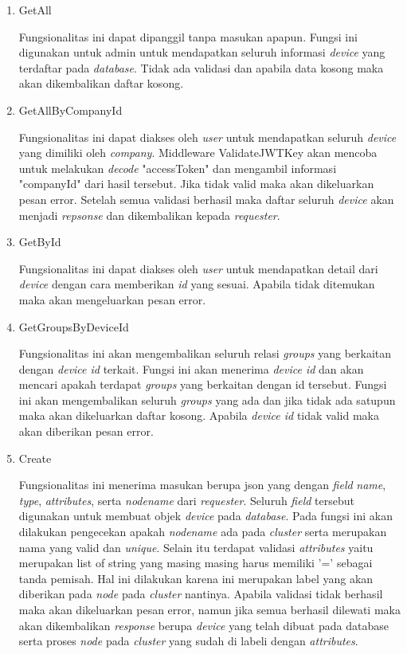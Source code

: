 \begin{enumerate}
  \item GetAll

        Fungsionalitas ini dapat dipanggil tanpa masukan apapun. Fungsi ini digunakan untuk admin untuk mendapatkan seluruh informasi \textit{device} yang terdaftar pada \textit{database}. Tidak ada validasi dan apabila data kosong maka akan dikembalikan daftar kosong.

  \item GetAllByCompanyId

        Fungsionalitas ini dapat diakses oleh \textit{user} untuk mendapatkan seluruh \textit{device} yang dimiliki oleh \textit{company}. Middleware ValidateJWTKey akan mencoba untuk melakukan \textit{decode} "accessToken" dan mengambil informasi "companyId" dari hasil tersebut. Jika tidak valid maka akan dikeluarkan pesan error. Setelah semua validasi berhasil maka daftar seluruh \textit{device} akan menjadi \textit{repsonse} dan dikembalikan kepada \textit{requester}.

  \item GetById

        Fungsionalitas ini dapat diakses oleh \textit{user} untuk mendapatkan detail dari \textit{device} dengan cara memberikan \textit{id} yang sesuai. Apabila tidak ditemukan maka akan mengeluarkan pesan error.

  \item GetGroupsByDeviceId


        Fungsionalitas ini akan mengembalikan seluruh relasi \textit{groups} yang berkaitan dengan \textit{device id} terkait. Fungsi ini akan menerima \textit{device id} dan akan mencari apakah terdapat \textit{groups} yang berkaitan dengan id tersebut. Fungsi ini akan mengembalikan seluruh \textit{groups} yang ada dan jika tidak ada satupun maka akan dikeluarkan daftar kosong. Apabila \textit{device id} tidak valid maka akan diberikan pesan error.

  \item Create

        Fungsionalitas ini menerima masukan berupa json yang dengan \textit{field} \textit{name}, \textit{type}, \textit{attributes}, serta \textit{node\textunderscore name} dari \textit{requester}. Seluruh \textit{field} tersebut digunakan untuk membuat objek \textit{device} pada \textit{database}. Pada fungsi ini akan dilakukan pengecekan apakah \textit{node\textunderscore name} ada pada \textit{cluster} serta merupakan nama yang valid dan \textit{unique}. Selain itu terdapat validasi \textit{attributes} yaitu merupakan list of string yang masing masing harus memiliki '=' sebagai tanda pemisah. Hal ini dilakukan karena ini merupakan label yang akan diberikan pada \textit{node} pada \textit{cluster} nantinya. Apabila validasi tidak berhasil maka akan dikeluarkan pesan error, namun jika semua berhasil dilewati maka akan dikembalikan \textit{response} berupa \textit{device} yang telah dibuat pada database serta proses \textit{node} pada \textit{cluster} yang sudah di labeli dengan \textit{attributes}.


\end{enumerate}
